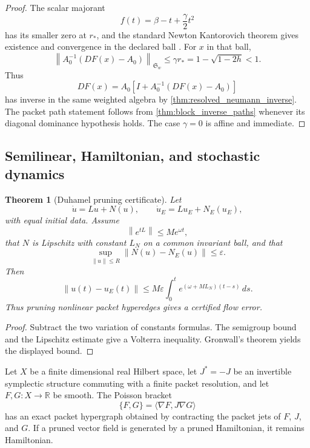 \documentclass{aomart}
\newtheorem{theorem}{Theorem}[section]
\theoremstyle{definition}
\theoremstyle{remark}
\newcommand{\RR}{\mathbb R}
\newcommand{\norm}[1]{\left\lVert#1\right\rVert}
\newcommand{\Rcite}[1]{\cite{#1}}
\begin{document}
\begin{proof}
The scalar majorant
\[
 f(t)=\beta-t+\frac\gamma2t^2
\]
has its smaller zero at \(r_*\), and the standard Newton Kantorovich theorem gives existence and convergence in the declared ball \Rcite{R15}. For \(x\) in that ball,
\[
 \norm{A_0^{-1}(DF(x)-A_0)}_{\mathfrak S_w}
 \leq
 \gamma r_*
 =
 1-\sqrt{1-2h}
 <1.
\]
Thus
\[
 DF(x)
 =
 A_0\left[I+A_0^{-1}(DF(x)-A_0)\right]
\]
has inverse in the same weighted algebra by \cref{thm:resolved_neumann_inverse}. The packet path statement follows from \cref{thm:block_inverse_paths} whenever its diagonal dominance hypothesis holds. The case \(\gamma=0\) is affine and immediate.
\end{proof}

\subsection{Semilinear, Hamiltonian, and stochastic dynamics}

\begin{theorem}[Duhamel pruning certificate]\label{thm:duhamel_pruning}
Let
\[
 \dot u=Lu+N(u),
 \qquad
 \dot u_E=Lu_E+N_E(u_E),
\]
with equal initial data. Assume
\[
 \norm{e^{tL}}\leq Me^{\omega t},
\]
that \(N\) is Lipschitz with constant \(L_N\) on a common invariant ball, and that
\[
 \sup_{\norm u\leq R}\norm{N(u)-N_E(u)}\leq\varepsilon.
\]
Then
\[
 \boxed{
 \norm{u(t)-u_E(t)}
 \leq
 M\varepsilon
 \int_0^t
 e^{(\omega+ML_N)(t-s)}\,ds.
 }
\]
Thus pruning nonlinear packet hyperedges gives a certified flow error.
\end{theorem}

\begin{proof}
Subtract the two variation of constants formulas. The semigroup bound and the Lipschitz estimate give a Volterra inequality. Gronwall's theorem yields the displayed bound.
\end{proof}

\begin{proposition}\label{prop:hamiltonian_packets}
Let \(X\) be a finite dimensional real Hilbert space, let \(J^*=-J\) be an invertible symplectic structure commuting with a finite packet resolution, and let \(F,G:X\to\RR\) be smooth. The Poisson bracket
\[
 \{F,G\}
 =
 \langle\nabla F,J\nabla G\rangle
\]
has an exact packet hypergraph obtained by contracting the packet jets of \(F\), \(J\), and \(G\). If a pruned vector field is generated by a pruned Hamiltonian, it remains Hamiltonian.
\end{proposition}
\end{document}
